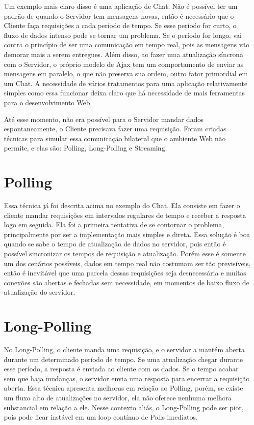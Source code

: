 \documentclass[a4paper,12pt]{article}
\begin{document}
Um exemplo mais claro disso é uma aplicação de Chat. Não é possível ter um padrão de quando o Servidor tem mensagens novas, então é necessário que o Cliente faça requisições a cada período de tempo. Se esse período for curto, o fluxo de dados intenso pode se tornar um problema. Se o período for longo, vai contra o princípio de ser uma comunicação em tempo real, pois as mensagens vão demorar mais a serem entregues. Além disso, ao fazer uma atualização síncrona com o Servidor, o próprio modelo de Ajax tem um comportamento de enviar as mensagens em paralelo, o que não preserva sua ordem, outro fator primordial em um Chat.
A necessidade de vários tratamentos para uma aplicação relativamente simples como essa funcionar deixa claro que há necessidade de mais ferramentas para o desenvolvimento Web.

Até esse momento, não era possível para o Servidor mandar dados espontaneamente, o Cliente precisava fazer uma requisição. Foram criadas técnicas para simular essa comunicação bilateral que o ambiente Web não permite, e elas são: Polling, Long-Polling e Streaming.

\section{Polling}

Essa técnica já foi descrita acima no exemplo do Chat. Ela consiste em fazer o cliente mandar requisições em intervalos regulares de tempo e receber a resposta logo em seguida. Ela foi a primeira tentativa de se contornar o problema, principalmente por ser a implementação mais simples e direta. Essa solução é boa quando se sabe o tempo de atualização de dados no servidor, pois então é possível sincronizar os tempos de requisição e atualização. Porém esse é somente um dos cenários possíveis, dados em tempo real não costumam ser tão previsíveis, então é inevitável que uma parcela dessas requisições seja desnecessária e muitas conexões são abertas e fechadas sem necessidade, em momentos de baixo fluxo de atualização do servidor.


\section{Long-Polling}

No Long-Polling, o cliente manda uma requisição, e o servidor a mantém aberta durante um determinado período de tempo. Se uma atualização chegar durante esse período, a resposta é enviada ao cliente com os dados. Se o tempo acabar sem que haja mudanças, o servidor envia uma resposta para encerrar a requisição aberta. Essa técnica apresenta melhoras em relação ao Polling, porém, se existe um fluxo alto de atualizações no servidor, ela não oferece nenhuma melhora substancial em relação a ele. Nesse contexto aliás, o Long-Polling pode ser pior, pois pode ficar instável em um loop contínuo de Polls imediatos.
\end{document}
